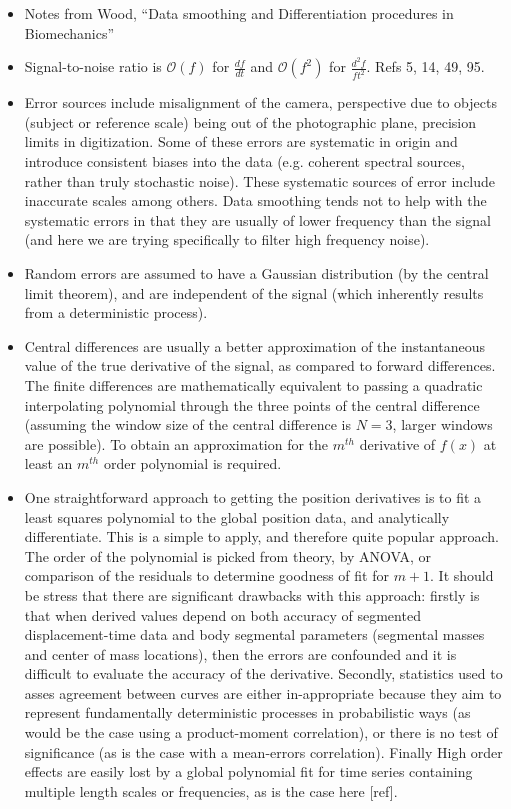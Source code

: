 \documentclass{jfm}
\begin{document}
\begin{itemize}
\item Notes from Wood, ``Data smoothing and Differentiation procedures in Biomechanics''

\item Signal-to-noise ratio is $\mathcal{O}(f)$ for $\frac{df}{dt}$ and $\mathcal{O}(f^2)$ for $\frac{d^2f}{ft^2}$. Refs 5, 14, 49, 95.

\item Error sources include misalignment of the camera, perspective due to objects (subject or reference scale) being out of the photographic plane, precision limits in digitization. Some of these errors are systematic in origin and introduce consistent biases into the data (e.g. coherent spectral sources, rather than truly stochastic noise). These systematic sources of error include inaccurate scales among others. Data smoothing tends not to help with the systematic errors in that they are usually of lower frequency than the signal (and here we are trying specifically to filter high frequency noise).

\item Random errors are assumed to have a Gaussian distribution (by the central limit theorem), and are independent of the signal (which inherently results from a deterministic process).

\item Central differences are usually a better approximation of the instantaneous value of the true derivative of the signal, as compared to forward differences. The finite differences are mathematically equivalent to passing a quadratic interpolating polynomial through the three points of the central difference (assuming the window size of the central difference is $N=3$, larger windows are possible). To obtain an approximation for the $m^{th}$ derivative of $f(x)$ at least an $m^{th}$ order polynomial is required.

\item One straightforward approach to getting the position derivatives is to fit a least squares polynomial to the global position data, and analytically differentiate. This is a simple to apply, and therefore quite popular approach. The order of the polynomial is picked from theory, by ANOVA, or comparison of the residuals to determine goodness of fit for $m+1$. It should be stress that there are significant drawbacks with this approach: firstly is that when derived values depend on both accuracy of segmented displacement-time data and body segmental parameters (segmental masses and center of mass locations), then the errors are confounded and it is difficult to evaluate the accuracy of the derivative. Secondly, statistics used to asses agreement between curves are either in-appropriate because they aim to represent fundamentally deterministic processes in probabilistic ways (as would be the case using a product-moment correlation), or there is no test of significance (as is the case with a mean-errors correlation). Finally High order effects are easily lost by a global polynomial fit for time series containing multiple length scales or frequencies, as is the case here [ref].
\end{itemize}
\end{document}
